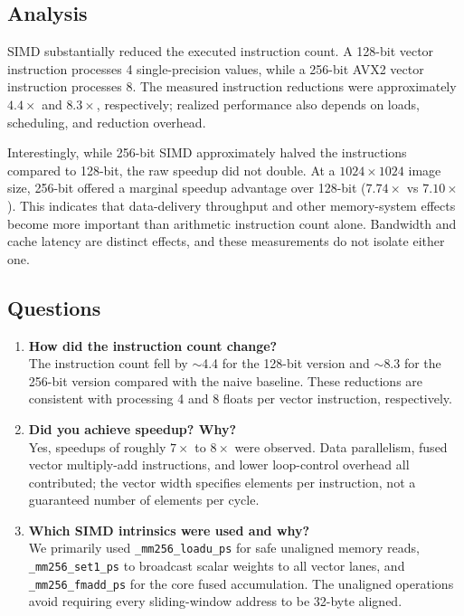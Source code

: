 \subsection{Analysis}
SIMD substantially reduced the executed instruction count. A 128-bit vector instruction processes 4 single-precision values, while a 256-bit AVX2 vector instruction processes 8. The measured instruction reductions were approximately $4.4\times$ and $8.3\times$, respectively; realized performance also depends on loads, scheduling, and reduction overhead.

Interestingly, while 256-bit SIMD approximately halved the instructions compared to 128-bit, the raw speedup did not double. At a $1024 \times 1024$ image size, 256-bit offered a marginal speedup advantage over 128-bit ($7.74\times$ vs $7.10\times$). This indicates that data-delivery throughput and other memory-system effects become more important than arithmetic instruction count alone. Bandwidth and cache latency are distinct effects, and these measurements do not isolate either one.

\subsection{Questions}

\begin{enumerate}
    \item \textbf{How did the instruction count change?} \\
    The instruction count fell by $\sim$4.4 for the 128-bit version and $\sim$8.3 for the 256-bit version compared with the naive baseline. These reductions are consistent with processing 4 and 8 floats per vector instruction, respectively.
    \item \textbf{Did you achieve speedup? Why?} \\
    Yes, speedups of roughly $7\times$ to $8\times$ were observed. Data parallelism, fused vector multiply-add instructions, and lower loop-control overhead all contributed; the vector width specifies elements per instruction, not a guaranteed number of elements per cycle.
    \item \textbf{Which SIMD intrinsics were used and why?} \\
    We primarily used \texttt{\_mm256\_loadu\_ps} for safe unaligned memory reads, \texttt{\_mm256\_set1\_ps} to broadcast scalar weights to all vector lanes, and \texttt{\_mm256\_fmadd\_ps} for the core fused accumulation. The unaligned operations avoid requiring every sliding-window address to be 32-byte aligned.
\end{enumerate}
